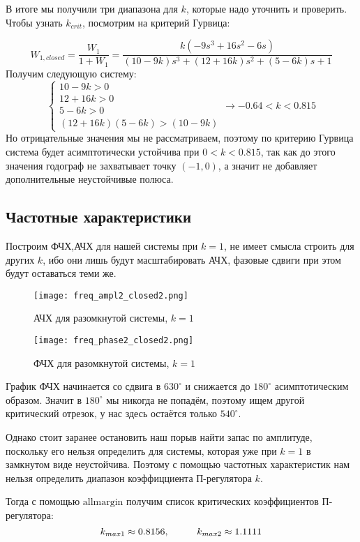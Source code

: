 В итоге мы получили три диапазона для $k$, которые надо уточнить и проверить.
Чтобы узнать $k_{crit}$, посмотрим на критерий Гурвица:

$$
    W_{1,closed} = \frac{W_1}{1+W_1} = \frac{k(-9s^3 + 16s^2 -6s)}{(10-9k)s^3 + (12+16k)s^2 + (5-6k)s + 1 }
$$
Получим следующую систему:
$$
    \begin{cases}
        10-9k > 0 \\
        12+16k > 0 \\
        5-6k > 0 \\
        (12+16k)(5-6k) > (10-9k)
    \end{cases} \to
    -0.64 < k < 0.815
$$
Но отрицательные значения мы не рассматриваем, поэтому по критерию Гурвица система будет асимптотически устойчива при $0 < k < 0.815$,
так как до этого значения годограф не захватывает точку $(-1, 0)$, а значит не добавляет дополнительные неустойчивые полюса.
\newpage
\subsection{Частотные характеристики}
Построим ФЧХ,АЧХ для нашей системы при $k=1$, не имеет смысла строить для других $k$, ибо они лишь будут масштабировать АЧХ, фазовые сдвиги при этом будут оставаться теми же.
\begin{figure}[ht]
    \centering
    \texttt{[image: freq\_ampl2\_closed2.png]}
    \caption{АЧХ для разомкнутой системы, $k=1$}
\end{figure}
\begin{figure}[ht]
    \centering
    \texttt{[image: freq\_phase2\_closed2.png]}
    \caption{ФЧХ для разомкнутой системы, $k=1$}
\end{figure}

График ФЧХ начинается со сдвига в $630^\circ$ и снижается до $180^\circ$ асимптотическим образом. Значит в $180^\circ$ мы никогда не попадём, поэтому
ищем другой критический отрезок, у нас здесь остаётся только $540^\circ$. 

Однако стоит заранее остановить наш порыв найти запас по амплитуде, поскольку его нельзя определить для системы, которая уже при $k=1$ в замкнутом виде неустойчива. 
Поэтому с помощью частотных характеристик нам нельзя определить диапазон коэффицциента П-регулятора $k$. 

Тогда с помощью $\textrm{allmargin}$ получим список критических коэффициентов П-регулятора:
$$
    k_{max1} \approx 0.8156, \hspace*{1cm} k_{max2} \approx 1.1111
$$

